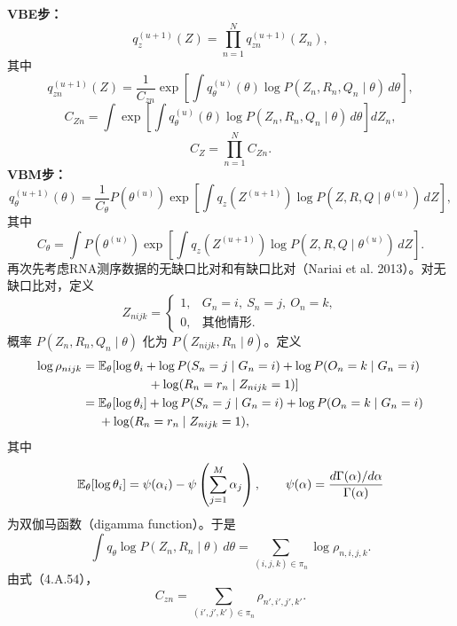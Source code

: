 \noindent\textbf{VBE步：}
\begin{equation}
q_z^{(u+1)}(Z)=\prod_{n=1}^{N}q_{zn}^{(u+1)}(Z_n),\tag{4.A.52}
\end{equation}
其中
\begin{equation}
q_{zn}^{(u+1)}(Z)=\frac1{C_{zn}}
\exp\left[\int q_\theta^{(u)}(\theta)\log P(Z_n,R_n,Q_n\mid\theta)\,d\theta\right],\tag{4.A.53}
\end{equation}
\begin{equation}
C_{Zn}=\int\exp\left[\int q_\theta^{(u)}(\theta)
\log P(Z_n,R_n,Q_n\mid\theta)\,d\theta\right]dZ_n,\tag{4.A.54}
\end{equation}
\begin{equation}
C_Z=\prod_{n=1}^{N}C_{Zn}.\tag{4.A.55}
\end{equation}
\noindent\textbf{VBM步：}
\begin{equation}
q_\theta^{(u+1)}(\theta)=\frac1{C_\theta}P(\theta^{(u)})
\exp\left[\int q_z(Z^{(u+1)})\log P(Z,R,Q\mid\theta^{(u)})\,dZ\right],\tag{4.A.56}
\end{equation}
其中
\[
C_\theta=\int P(\theta^{(u)})
\exp\left[\int q_z(Z^{(u+1)})\log P(Z,R,Q\mid\theta^{(u)})\,dZ\right].
\]
再次先考虑RNA测序数据的无缺口比对和有缺口比对（Nariai et al. 2013）。对无缺口比对，定义
\[
Z_{nijk}=\begin{cases}1,&G_n=i,\ S_n=j,\ O_n=k,\\0,&\text{其他情形}.
\end{cases}
\]
概率 $P(Z_n,R_n,Q_n\mid\theta)$ 化为 $P(Z_{nijk},R_n\mid\theta)$。定义
\[
\begin{aligned}
\log\rho_{nijk}
={}&\mathbb{E}_\theta[\log\theta_i+\log P(S_n=j\mid G_n=i)
 +\log P(O_n=k\mid G_n=i)\\
 &\hspace{4em}{}+\log(R_n=r_n\mid Z_{nijk}=1)]\\
={}&\mathbb{E}_\theta[\log\theta_i]+\log P(S_n=j\mid G_n=i)
 +\log P(O_n=k\mid G_n=i)\\
 &{}+\log(R_n=r_n\mid Z_{nijk}=1),
\end{aligned}
\]
其中
\[
\mathbb{E}_\theta[\log\theta_i]=\psi(\alpha_i)-\psi\left(\sum_{j=1}^{M}\alpha_j\right),
\qquad \psi(\alpha)=\frac{d\Gamma(\alpha)/d\alpha}{\Gamma(\alpha)}
\]
为双伽马函数（digamma function）。于是
\begin{equation}
\int q_\theta\log P(Z_n,R_n\mid\theta)\,d\theta
=\sum_{(i,j,k)\in\pi_n}\log\rho_{n,i,j,k}.\tag{4.A.57}
\end{equation}
由式（4.A.54），
\begin{equation}
C_{zn}=\sum_{(i',j',k')\in\pi_n}\rho_{n',i',j',k'}.\tag{4.A.58}
\end{equation}
